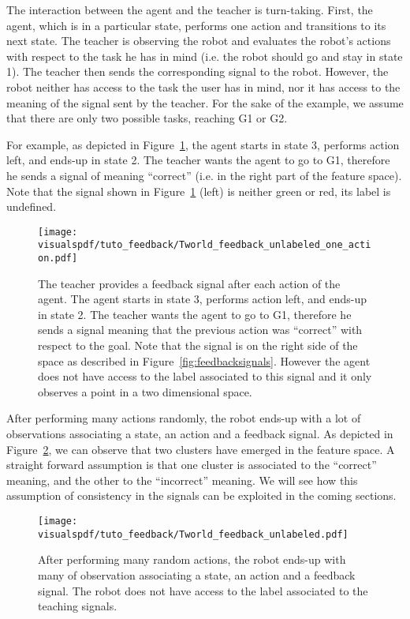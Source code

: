 The interaction between the agent and the teacher is turn-taking. First, the agent, which is in a particular state, performs one action and transitions to its next state. The teacher is observing the robot and evaluates the robot's actions with respect to the task he has in mind (i.e. the robot should go and stay in state 1). The teacher then sends the corresponding signal to the robot. However, the robot neither has access to the task the user has in mind, nor it has access to the meaning of the signal sent by the teacher. For the sake of the example, we assume that there are only two possible tasks, reaching G1 or G2.

For example, as depicted in Figure~\ref{fig:TworldOneStepUnlabeled}, the agent starts in state 3, performs action left, and ends-up in state 2. The teacher wants the agent to go to G1, therefore he sends a signal of meaning ``correct'' (i.e. in the right part of the feature space). Note that the signal shown in Figure~\ref{fig:TworldOneStepUnlabeled} (left) is neither green or red, its label is undefined.

\begin{figure}[!htbp]
  \centering
  \texttt{[image: \\visualspdf/tuto\_feedback/Tworld\_feedback\_unlabeled\_one\_action.pdf]}
  \caption{The teacher provides a feedback signal after each action of the agent. The agent starts in state 3, performs action left, and ends-up in state 2. The teacher wants the agent to go to G1, therefore he sends a signal meaning that the previous action was ``correct'' with respect to the goal. Note that the signal is on the right side of the space as described in Figure~\ref{fig:feedbacksignals}. However the agent does not have access to the label associated to this signal and it only observes a point in a two dimensional space.}
  \label{fig:TworldOneStepUnlabeled}
\end{figure}

After performing many actions randomly, the robot ends-up with a lot of observations associating a state, an action and a feedback signal. As depicted in Figure~\ref{fig:TworldManyStepUnlabeled}, we can observe that two clusters have emerged in the feature space. A straight forward assumption is that one cluster is associated to the ``correct'' meaning, and the other to the ``incorrect'' meaning. We will see how this assumption of consistency in the signals can be exploited in the coming sections.

\begin{figure}[!htbp]
  \centering
  \texttt{[image: \\visualspdf/tuto\_feedback/Tworld\_feedback\_unlabeled.pdf]}
  \caption{After performing many random actions, the robot ends-up with many of observation associating a state, an action and a feedback signal. The robot does not have access to the label associated to the teaching signals.}
  \label{fig:TworldManyStepUnlabeled}
\end{figure}

